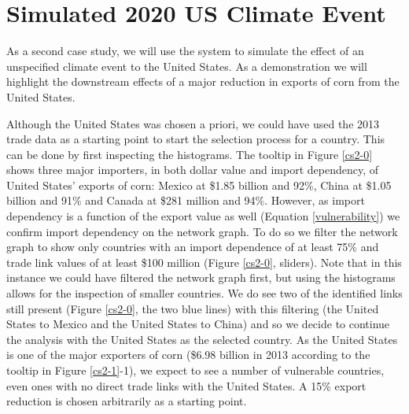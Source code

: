 \section{Simulated 2020 US Climate Event}
As a second case study, we will use the system to simulate the effect of an unspecified climate event to the United States. As a demonstration we will highlight the downstream effects of a major reduction in exports of corn from the United States.\par
Although the United States was chosen a priori, we could have used the 2013 trade data as a starting point to start the selection process for a country. This can be done by first inspecting the histograms. The tooltip in Figure \ref{cs2-0} shows three major importers, in both dollar value and import dependency, of United States' exports of corn: Mexico at \$1.85 billion and 92\%, China at \$1.05 billion and 91\% and Canada at \$281 million and 94\%. However, as import dependency is a function of the export value as well (Equation \ref{vulnerability}) we confirm import dependency on the network graph. To do so we filter the network graph to show only countries with an import dependence of at least 75\% and trade link values of at least \$100 million (Figure \ref{cs2-0}, sliders). Note that in this instance we could have filtered the network graph first, but using the histograms allows for the inspection of smaller countries. We do see two of the identified links still present (Figure \ref{cs2-0}, the two blue lines) with this filtering (the United States to Mexico and the United States to China) and so we decide to continue the analysis with the United States as the selected country. As the United States is one of the major exporters of corn (\$6.98 billion in 2013 according to the tooltip in Figure \ref{cs2-1}-1), we expect to see a number of vulnerable countries, even ones with no direct trade links with the United States. A 15\% export reduction is chosen arbitrarily as a starting point.\par
